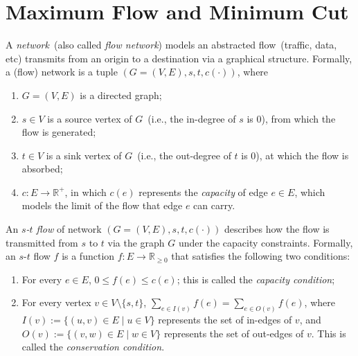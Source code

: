 \setcounter{definition}{0} \setcounter{property}{0} \setcounter{claim}{0} \setcounter{fact}{0} \setcounter{corollary}{0} \setcounter{figure}{0}
\section{Maximum Flow and Minimum Cut}


A \emph{network}~(also called \emph{flow network}) models 
an abstracted flow~(traffic, data, etc) transmits from an origin to a destination
via a graphical structure. Formally, a (flow) network is a tuple $(G = (V, E), s, t, c(\cdot))$, where

\vspace*{-\topsep}
\begin{enumerate}
\item $G = (V, E)$ is a directed graph;
\item $s\in V$ is a source vertex of $G$~(i.e., the in-degree of $s$ is 0), from which the flow is generated;
\item $t\in V$ is a sink vertex of $G$~(i.e., the out-degree of $t$ is 0), at which the flow is absorbed;
\item $c: E\to \mathbb{R}^+$, in which $c(e)$ represents the \emph{capacity} of edge $e\in E$, which models the limit of the flow that edge $e$ can carry.
\end{enumerate}

An \emph{$s$-$t$ flow} of network $(G = (V, E), s, t, c(\cdot))$
describes {how} the flow is transmitted from $s$ to $t$
via the graph $G$ under the capacity constraints. Formally,
an $s$-$t$ flow $f$ is a function $f: E\to \mathbb{R}_{\ge 0}$
that satisfies the following two conditions:
\vspace*{-\topsep}
\begin{enumerate}
\item For every $e\in E$, $0\le f(e) \le c(e)$; this is called the \emph{capacity condition};
\item For every vertex $v\in V\setminus\{s,t\}$, $\sum_{e\in I(v)} f(e) = \sum_{e\in O(v)} f(e)$, where $I(v) := \{(u,v)\in E\mid u\in V\}$ represents
the set of in-edges of $v$, and $O(v) := \{(v,w)\in E\mid w\in V\}$ represents
the set of out-edges of $v$. This is called the \emph{conservation condition}.
\end{enumerate}

